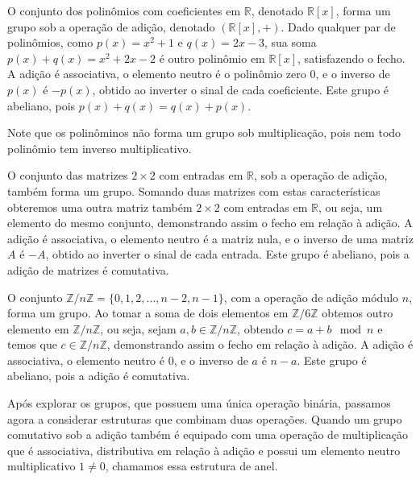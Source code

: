 \begin{example}
O conjunto dos polinômios com coeficientes em $\mathbb{R}$,
denotado $\mathbb{R}[x]$, forma um grupo sob a operação de adição,
  denotado $(\mathbb{R}[x], +)$.
Dado qualquer par de polinômios, como $p(x) = x^2 + 1$ e $q(x) = 2x - 3$,
sua soma $p(x) + q(x) = x^2 + 2x - 2$ é outro polinômio em $\mathbb{R}[x]$,
satisfazendo o fecho. A adição é associativa, o elemento neutro é o polinômio zero $0$,
e o inverso de $p(x)$ é $-p(x)$, obtido ao inverter o sinal de cada coeficiente.
Este grupo é abeliano, pois $p(x) + q(x) = q(x) + p(x)$.

Note que os polinôminos não forma um grupo sob multiplicação, pois nem todo polinômio tem inverso multiplicativo.
\end{example}

\begin{example}
O conjunto das matrizes $2 \times 2$ com entradas em $\mathbb{R}$,
sob a operação de adição, também forma um grupo.
Somando duas matrizes com estas características obteremos uma outra matriz
também $2 \times 2$ com entradas em $\mathbb{R}$, ou seja, um elemento
do mesmo conjunto, demonstrando assim o fecho em relação à adição.
A adição é associativa, o elemento neutro é a matriz nula, e o inverso de uma matriz $A$ é $-A$,
obtido ao inverter o sinal de cada entrada. Este grupo é abeliano, pois a adição de matrizes é comutativa. 
\end{example}

\begin{example}
O conjunto $\mathbb{Z}/n\mathbb{Z} = \{0, 1, 2, \ldots, n-2, n-1\}$,
com a operação de adição módulo $n$, forma um grupo.
Ao tomar a soma de dois elementos em $\mathbb{Z}/6\mathbb{Z}$ obtemos
outro elemento em $\mathbb{Z}/n\mathbb{Z}$, ou seja, sejam
$a,b \in \mathbb{Z}/n\mathbb{Z}$, obtendo $c = a + b \mod n$ e
temos que $c \in \mathbb{Z}/n\mathbb{Z}$, demonstrando assim o fecho em relação
à adição. A adição é associativa, o elemento neutro é $0$, e o inverso de $a$ é $n - a$.
Este grupo é abeliano, pois a adição é comutativa. 
\end{example}



Após explorar os grupos, que possuem uma única operação binária, passamos
agora a considerar estruturas que combinam duas operações. Quando um grupo
comutativo sob a adição também é equipado com uma operação de multiplicação que
é associativa, distributiva em relação à adição e possui um elemento neutro
multiplicativo $1 \neq 0$, chamamos essa estrutura de anel.







